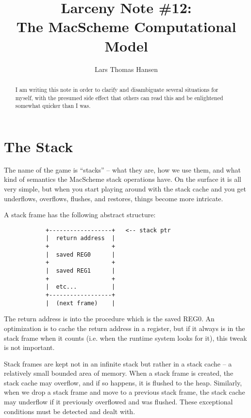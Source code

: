 %



\title{Larceny Note \#12: \\
       The MacScheme Computational Model}
\author{Lars Thomas Hansen}


\maketitle

\begin{abstract}
I am writing this note in order to clarify and disambiguate several situations
for myself, with the presumed side effect that others can read this and be
enlightened somewhat quicker than I was.
\end{abstract}

\section{The Stack}

The name of the game is ``stacks'' -- what they are, how we use them, and
what kind of semantics the MacScheme stack operations have. On the surface
it is all very simple, but when you start playing around with the stack cache
and you get underflows, overflows, flushes, and restores, things become
more intricate.

A stack frame has the following abstract structure:

\begin{verbatim}
            +------------------+   <-- stack ptr
            |  return address  |
            +                  +
            |  saved REG0      |
            +                  +
            |  saved REG1      |
            +                  +
            |  etc...          |
            +------------------+
            |  (next frame)    |
\end{verbatim}

The return address is into the procedure which is the saved REG0. An 
optimization is to cache the return address in a register, but if it
always is in the stack frame when it counts (i.e. when the runtime
system looks for it), this tweak is not important.

Stack frames are kept not in an infinite stack but rather in a stack
cache -- a relatively small bounded area of memory. When a stack frame
is created, the stack cache may overflow, and if so happens, it is
flushed to the heap. Similarly, when we drop a stack frame and move
to a previous stack frame, the stack cache may underflow if it previously
overflowed and was flushed. These exceptional conditions must be
detected and dealt with.

